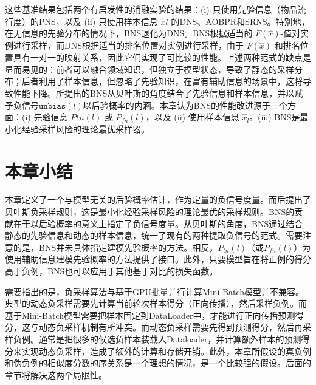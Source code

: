 这些基准结果包括两个有启发性的消融实验的结果：(i) 只使用先验信息（物品流行度）的\textsf{PNS}，以及 (ii) 只使用样本信息 $\hat{x}l$ 的\textsf{DNS}、\textsf{AOBPR}和\textsf{SRNS}。特别地，在无信息的先验分布的情况下，\textsf{BNS}退化为\textsf{DNS}。\textsf{BNS}根据适当的 $F(\hat{x})$-值对实例进行采样，而\textsf{DNS}根据适当的排名位置对实例进行采样，由于 $F(\hat{x})$ 和排名位置具有一对一的映射关系，因此它们实现了可比较的性能。上述两种范式的缺点是显而易见的：前者可以融合领域知识，但独立于模型状态，导致了静态的采样分布；后者利用了样本信息，但忽略了先验知识，在富有辅助信息的场景中，这将导致性能下降。所提出的\textsf{BNS}从贝叶斯的角度结合了先验信息和样本信息，并以赋予负信号$\mathtt{unbias}(l)$以后验概率的内涵。本章认为\textsf{BNS}的性能改进源于三个方面：(i) 先验信息 $P{tn}(l)$ 或 $P_{fn}(l)$，以及 (ii) 使用样本信息 $\hat{x}_l$。(iii) \textsf{BNS}是最小化经验采样风险的理论最优采样器。

\section{本章小结}\label{Sec:Conclusion}
本章定义了一个与模型无关的后验概率估计，作为定量的负信号度量。而后提出了贝叶斯负采样规则，这是最小化经验采样风险的理论最优的采样规则。\textsf{BNS}的贡献在于以后验概率的意义上指定了负信号度量。从贝叶斯的角度，\textsf{BNS}通过结合静态的先验信息和动态的样本信息，统一了现有的两种提取负信号的范式。需要注意的是，\textsf{BNS}并未具体指定建模先验概率的方法。相反，$P_{tn}(l)$（或$P_{fn}(l)$）为使用辅助信息建模先验概率的方法提供了接口。此外，只要模型旨在将正例的得分高于负例，\textsf{BNS}也可以应用于其他基于对比的损失函数。

需要指出的是，负采样算法与基于GPU批量并行计算Mini-Batch模型并不兼容。典型的动态负采样需要先计算当前轮次样本得分（正向传播），然后采样负例。而基于Mini-Batch模型需要把样本固定到DataLoader中，才能进行正向传播预测得分，这与动态负采样机制有所冲突。而动态负采样需要先得到预测得分，然后再采样负例。通常是把很多的候选负样本装载入Dataloader，并计算额外样本的预测得分来实现动态负采样，造成了额外的计算和存储开销。此外，本章所假设的真负例和伪负例的相似度分数的序关系是一个理想的情况，是一个比较强的假设。后面的章节将解决这两个局限性。
